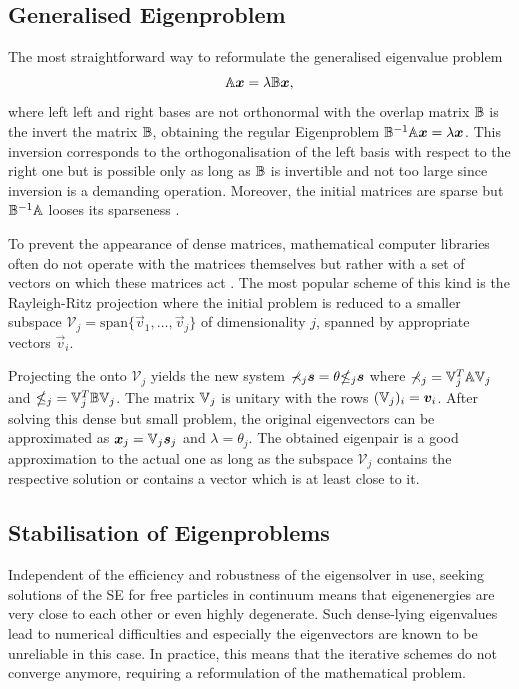 \subsection{Generalised Eigenproblem}
\label{ch:GenEV}
The most straightforward way to reformulate the generalised eigenvalue problem
\begin{equation} \label{eq:Gep}
\mathbb{A}\bm{x}=\lambda\mathbb{B}\bm{x},
\end{equation}
where left left and right bases are not orthonormal with the overlap matrix $\mathbb{B}$ is the invert the matrix $\mathbb{B}$, obtaining the regular Eigenproblem $\mathbb{B}^{-1}\mathbb{A}\bm{x}=\lambda\bm{x}$.
This inversion corresponds to the orthogonalisation of the left basis with respect to the right one but is possible only as long as $\mathbb{B}$ is invertible and not too large since inversion is a demanding operation.
Moreover, the initial matrices are sparse but $\mathbb{B}^{-1}\mathbb{A}$ looses its sparseness \cite{slepcManual}.

To prevent the appearance of dense matrices, mathematical computer libraries often do not operate with the matrices themselves but rather with a set of vectors on which these matrices act \cite{slepcManual}.
The most popular scheme of this kind is the Rayleigh-Ritz projection where the initial problem is reduced to a smaller subspace $\mathcal{V}_j=\text{span} \{\vec{v}_1,\hdots,\vec{v}_j\}$ of dimensionality $j$, spanned by appropriate vectors $\vec{v}_i$.

Projecting the  onto $\mathcal{V}_j$ yields the new system $\mathbb{\Sigma}_j \bm{s}=\theta\mathbb{\Theta}_j\bm{s}$ where $\mathbb{\Sigma}_j=\mathbb{V}_j^T\mathbb{A}\mathbb{V}_j$ and $\mathbb{\Theta}_j=\mathbb{V}_j^T\mathbb{B}\mathbb{V}_j$.
The matrix $\mathbb{V}_j$ is unitary with the rows $(\mathbb{V}_j)_i=\bm{v}_i$.
After solving this dense but small problem, the original eigenvectors can be approximated as $\bm{x}_j=\mathbb{V}_j\bm{s}_j$ and $\lambda=\theta_j$.
The obtained eigenpair is a good approximation to the actual one as long as the subspace $\mathcal{V}_j$ contains the respective solution or contains a vector which is at least close to it.

\subsection{Stabilisation of Eigenproblems}
\label{ch:regular}
Independent of the efficiency and robustness of the eigensolver in use, seeking solutions of the SE for free particles in continuum means that eigenenergies are very close to each other or even highly degenerate.
Such dense-lying eigenvalues lead to numerical difficulties and especially the eigenvectors are known to be unreliable in this case.
In practice, this means that the iterative schemes do not converge anymore, requiring a reformulation of the mathematical problem.


